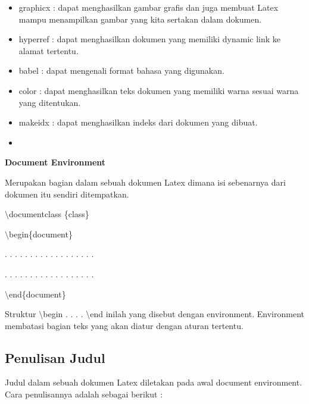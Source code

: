 \begin{itemize}
\item graphicx : dapat menghasilkan gambar grafis dan juga membuat Latex mampu menampilkan gambar yang kita sertakan dalam dokumen.
\item hyperref : dapat menghasilkan dokumen yang memiliki dynamic link ke alamat tertentu.
\item babel : dapat mengenali format bahasa yang digunakan.
\item color : dapat menghasilkan teks dokumen yang memiliki warna sesuai warna yang ditentukan.
\item makeidx : dapat menghasilkan indeks dari dokumen yang dibuat.
\item 
\end{itemize}
\textbf{Document Environment}\par \vspace{12pt}

Merupakan bagian dalam sebuah dokumen Latex dimana isi sebenarnya dari dokumen itu sendiri ditempatkan.
\par \vspace{12pt}
$\setminus$documentclass \{class\}\par \vspace{12pt}

$\setminus$begin\{document\}\par \vspace{12pt}

. . . . . . . . . . . . . . . . . .

. . . . . . . . . . . . . . . . . .\par \vspace{12pt}

$\setminus$end\{document\}\par \vspace{12pt}

Struktur $\setminus$begin . . . . $\setminus$end inilah yang disebut dengan environment. Environment membatasi bagian teks yang akan diatur dengan aturan tertentu.\par \vspace{12pt}

\subsection {Penulisan Judul}\par \vspace{12pt}

Judul dalam sebuah dokumen Latex diletakan pada awal document 
environment. Cara penulisannya adalah sebagai berikut :\par \vspace{12pt}

